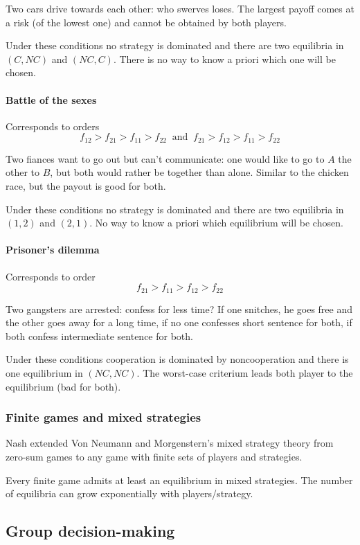 Two cars drive towards each other: who swerves loses. The largest payoff comes at a risk (of the lowest one) and cannot be obtained by both players. 

Under these conditions no strategy is dominated and there are two equilibria in $(C, NC)$ and $(NC, C)$. There is no way to know a priori which one will be chosen.

\paragraph{Battle of the sexes} Corresponds to orders
$$ f_{12} > f_{21} > f_{11} > f_{22} \ \text{ and } \ f_{21} > f_{12} > f_{11} > f_{22} $$

Two fiances want to go out but can't communicate: one would like to go to $A$ the other to $B$, but both would rather be together than alone. Similar to the chicken race, but the payout is good for both.

Under these conditions no strategy is dominated and there are two equilibria in $(1,2)$ and $(2,1)$. No way to know a priori which equilibrium will be chosen.

\paragraph{Prisoner's dilemma} Corresponds to order
$$ f_{21} > f_{11} > f_{12} > f_{22} $$

Two gangsters are arrested: confess for less time? If one snitches, he goes free and the other goes away for a long time, if no one confesses short sentence for both, if both confess intermediate sentence for both.

Under these conditions cooperation is dominated by noncooperation and there is one equilibrium in $(NC, NC)$. The worst-case criterium leads both player to the equilibrium (bad for both).

\subsubsection{Finite games and mixed strategies}

Nash extended Von Neumann and Morgenstern's mixed strategy theory from zero-sum games to any game with finite sets of players and strategies. 

Every finite game admits at least an equilibrium in mixed strategies. The number of equilibria can grow exponentially with players/strategy.

\subsection{Group decision-making}

